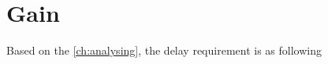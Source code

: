 \newcommand{\reqgain}{The delay unit must delay the input signal, in time defined by external unit.}

\section{Gain}
Based on the \autoref{ch:analysing}, the delay requirement is as following

\begin{requirement}\label{req:gain_ex}
\end{requirement}



